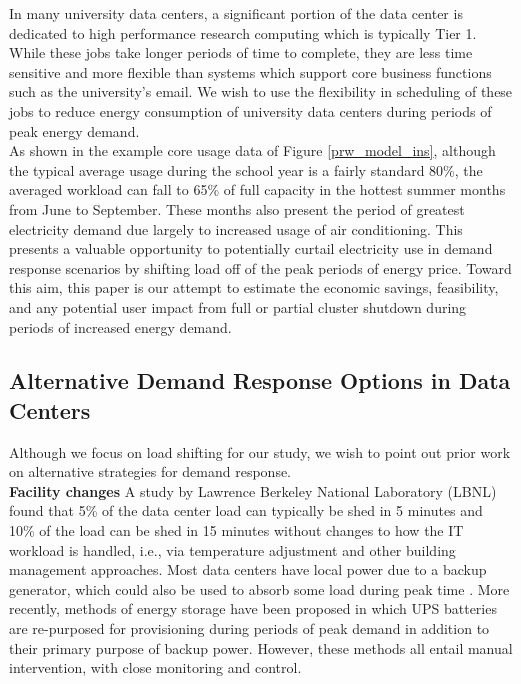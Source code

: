 \documentclass[letterpaper,twocolumn,10pt]{article}
\begin{document}
In many university data centers, a significant portion of the data center is dedicated to high performance research computing which is typically Tier 1. While these jobs take longer periods of time to complete, they are less time sensitive and more flexible than systems which support core business functions such as the university's email.  We wish to use the flexibility in scheduling of these jobs to reduce energy consumption of university data centers during periods of peak energy demand. \\  

As shown in the example core usage data of Figure \ref{prw_model_ins}, although the typical average usage during the school year is a fairly standard 80\%, the averaged workload can fall to 65\% of full capacity in the hottest summer months from June to September. These months also present the period of greatest electricity demand due largely to increased usage of air conditioning. This presents a valuable opportunity to potentially curtail electricity use in demand response scenarios by shifting load off of the peak periods of energy price.  Toward this aim, this paper is our attempt to estimate the economic savings, feasibility, and any potential user impact from full or partial cluster shutdown during periods of increased energy demand.


\subsection{Alternative Demand Response Options in Data Centers}

Although we focus on load shifting for our study, we wish to point out prior work on alternative strategies for demand response. \\

\textbf{Facility changes} A study by Lawrence Berkeley National Laboratory (LBNL) found that 5\% of the data center load can typically be shed in 5 minutes and 10\% of the load can be shed in 15 minutes without changes to how the IT workload is handled, i.e., via temperature adjustment and other building management approaches\cite{Ghatikar2012}. Most data centers have local power due to a backup generator, which could also be used to absorb some load during peak time \cite{Liu2013}. More recently, methods of energy storage have been proposed\cite{Narayanan2014} in which UPS batteries are re-purposed for provisioning during periods of peak demand in addition to their primary purpose of backup power. However, these methods all entail manual intervention, with close monitoring and control.
\end{document}
